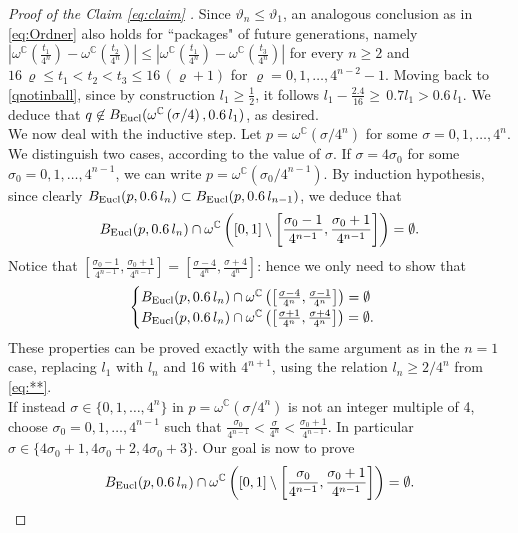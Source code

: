 \documentclass[12pt]{amsart}
\newcommand{\C}{\mathbb C}
\renewcommand{\rho}{\varrho}
\renewcommand{\theta}{\vartheta}
\numberwithin{equation}{section}
\theoremstyle{plain}
\theoremstyle{definition}
\theoremstyle{remark}
\begin{document}
\begin{proof}[Proof of the Claim \eqref{eq:claim} ]
   Since $\theta_n\leq \theta_1$, an analogous conclusion as in \eqref{eq:Ordner} also holds for ``packages" of future generations, namely $\left|\omega^\C\left(\frac{t_1}{4^n}\right)-\omega^\C\left(\frac{t_2}{4^n}\right)\right|\leq \left|\omega^\C\left(\frac{t_1}{4^n}\right)-\omega^\C\left(\frac{t_3}{4^n}\right)\right|$ for every $n\geq 2$ and $16\,\rho\leq t_1<t_2<t_3\leq 16\,(\rho+1) $ for $  \rho=0,1,\dots, 4^{n-2}-1$.
   Moving back to \eqref{qnotinball}, since by construction $l_1\geq \frac{1}{2}$, it follows $l_1-\frac{2.4}{16}\geq \,0.7 l_1>0.6 \,l_1$. We deduce that $q\not\in B_{\rm Eucl}(\omega^\C\left(\sigma/4\right), 0.6\,l_1)$, as desired.\medskip\\
   We now deal with the inductive step. Let $p=\omega^\C(\sigma/4^n)$ for some $\sigma=0,1,\dots, 4^n$. We distinguish two cases, according to the value of $\sigma$. If $\sigma=4\sigma_0$ for some $\sigma_0=0,1,\dots, 4^{n-1}$, we can write $p=\omega^\C(\sigma_0/4^{n-1})$. By induction hypothesis, since clearly $B_{\rm Eucl}(p,0.6\,l_n)\subset B_{\rm Eucl}(p, 0.6 \,l_{n-1})$, we deduce that
   \[B_{\rm Eucl}(p,0.6\,l_n)\cap \omega^\C\left([0,1]\setminus\left[\frac{\sigma_0-1}{4^{n-1}},\frac{\sigma_0 +1}{4^{n-1}}\right]\right)=\emptyset.\]
   Notice that $\left[\frac{\sigma_0-1}{4^{n-1}},\frac{\sigma_0 +1}{4^{n-1}}\right]=\left[\frac{\sigma-4}{4^n},\frac{\sigma+4}{4^n}\right]$: hence we only need to show that \[\begin{cases} B_{\rm Eucl}(p,0.6\,l_n)\cap \omega^\C\left(\left[\frac{\sigma-4}{4^n},\frac{\sigma-1}{4^n}\right]\right)=\emptyset \\ B_{\rm Eucl}(p,0.6\,l_n)\cap \omega^\C\left(\left[\frac{\sigma+1}{4^n},\frac{\sigma+4}{4^n}\right]\right)=\emptyset.\end{cases}\]
 These properties can be proved exactly with the same argument as in the $n=1$ case, replacing $l_1$ with $l_n$ and 16 with $4^{n+1}$, using the relation $l_n\geq 2/4^n$ from \eqref{eq:**}.\medskip\\
 If instead $\sigma\in \{0,1,\ldots,4^n\}$ in $p=\omega^\C(\sigma/4^n)$  is not an integer multiple of 4, choose $\sigma_0=0,1,\dots, 4^{n-1}$ such that $\frac{\sigma_0}{4^{n-1}}<\frac{\sigma}{4^n}<\frac{\sigma_0+1}{4^{n-1}}.$
 In particular $\sigma\in\{4\sigma_0+1, 4\sigma_0+2, 4\sigma_0+3\}$. Our goal is now to prove
 \begin{equation}\label{intermediategoal}
     B_{\rm Eucl}(p,0.6\,l_n)\cap \omega^\C\left([0,1]\setminus\left[\frac{\sigma_0}{4^{n-1}},\frac{\sigma_0 +1}{4^{n-1}}\right]\right)=\emptyset.

\end{equation}
\end{proof}
\end{document}
